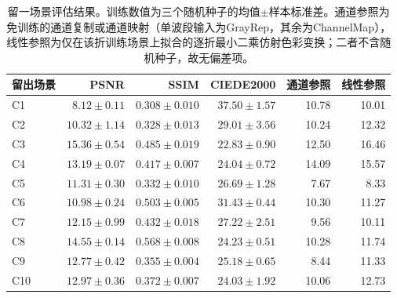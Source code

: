\begin{table}[H]
\centering
\caption{留一场景评估结果。训练数值为三个随机种子的均值$\pm$样本标准差。通道参照为免训练的通道复制或通道映射（单波段输入为GrayRep，其余为ChannelMap），线性参照为仅在该折训练场景上拟合的逐折最小二乘仿射色彩变换；二者不含随机种子，故无偏差项。}
\label{tab:scene-results-zh}
\small
\begin{tabular}{lrrrrr}
\toprule
留出场景 & PSNR & SSIM & CIEDE2000 & 通道参照 & 线性参照 \\
\midrule
C1 & $8.12\pm0.11$ & $0.308\pm0.010$ & $37.50\pm1.57$ & 10.78 & 10.01 \\
C2 & $10.32\pm1.14$ & $0.328\pm0.013$ & $29.01\pm3.56$ & 10.24 & 12.32 \\
C3 & $15.36\pm0.54$ & $0.485\pm0.019$ & $22.83\pm0.90$ & 12.50 & 16.46 \\
C4 & $13.19\pm0.07$ & $0.417\pm0.007$ & $24.04\pm0.72$ & 14.09 & 15.57 \\
C5 & $11.31\pm0.30$ & $0.332\pm0.010$ & $26.69\pm1.28$ & 7.67 & 8.33 \\
C6 & $10.98\pm0.24$ & $0.503\pm0.005$ & $31.43\pm0.44$ & 10.30 & 11.27 \\
C7 & $12.15\pm0.99$ & $0.432\pm0.018$ & $27.22\pm2.51$ & 9.56 & 10.11 \\
C8 & $14.55\pm0.14$ & $0.568\pm0.008$ & $24.23\pm0.51$ & 10.28 & 11.74 \\
C9 & $12.77\pm0.42$ & $0.355\pm0.004$ & $25.18\pm0.65$ & 8.44 & 11.33 \\
C10 & $12.97\pm0.36$ & $0.372\pm0.007$ & $24.03\pm1.92$ & 10.06 & 12.73 \\
\bottomrule
\end{tabular}
\end{table}
